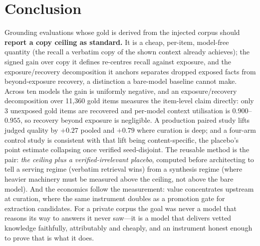 \documentclass[10pt,twocolumn]{article}
\begin{document}
\section{Conclusion}\label{sec:conclusion}
Grounding evaluations whose gold is derived from the injected corpus should \textbf{report a copy
ceiling as standard.} It is a cheap, per-item, model-free quantity (the recall a verbatim copy of the
shown context already achieves); the signed gain over copy it defines re-centres recall against
exposure, and the exposure/recovery decomposition it anchors separates dropped exposed facts from
beyond-exposure recovery, a distinction a bare-model baseline cannot
make. Across ten models the gain is uniformly negative, and an exposure/recovery decomposition over
11{,}360 gold items measures the item-level claim directly: only 3 unexposed gold items are recovered
and per-model context utilisation is $0.900$--$0.955$, so recovery beyond exposure is negligible. A
production paired study lifts judged quality by $+0.27$ pooled and $+0.79$ where curation is deep; and a
four-arm control study is consistent with that lift being content-specific, the placebo's point
estimate collapsing once verified seed-disjoint. The reusable
method is the pair: \emph{the ceiling plus a verified-irrelevant placebo}, computed before architecting to
tell a serving regime (verbatim retrieval wins) from a synthesis regime (where heavier machinery must
be measured above the ceiling, not above the bare model). And the economics follow the measurement:
value concentrates upstream at curation, where the same instrument doubles as a promotion gate for
extraction candidates. For a private corpus the goal was never a model that reasons its way to answers
it never saw---it is a model that delivers vetted knowledge faithfully, attributably and cheaply, and
an instrument honest enough to prove that is what it does.

\printbibliography
\end{document}
